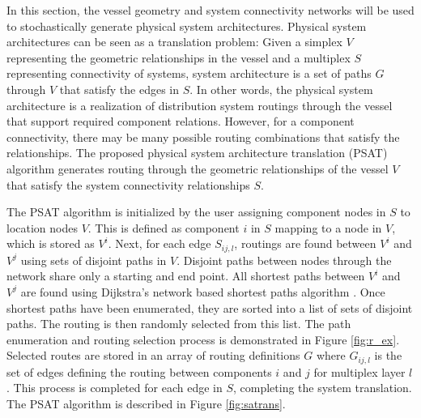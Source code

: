 \documentclass[preprint,12pt]{elsarticle}
\begin{document}
In this section, the vessel geometry and system connectivity networks will be used to stochastically generate physical system architectures. Physical system architectures can be seen as a translation problem: Given a simplex $V$ representing the geometric relationships in the vessel and a multiplex $S$ representing connectivity of systems, system architecture is a set of paths $G$ through $V$ that satisfy the edges in $S$. In other words, the physical system architecture is a realization of distribution system routings through the vessel that support required component relations. However, for a component connectivity, there may be many possible routing combinations that satisfy the relationships. The proposed physical system architecture translation (PSAT) algorithm  generates routing through the geometric relationships of the vessel $V$ that satisfy the system connectivity relationships $S$.   


The PSAT algorithm is initialized by the user assigning component nodes in $S$ to location nodes $V$. This is defined as component $i$ in $S$ mapping to a node in $V$, which is stored as $V^i$. Next, for each edge $S_{ij,l}$, routings are found between $V^i$ and $V^j$ using sets of disjoint paths in $V$. Disjoint paths between nodes through the network share only a starting and end point. All shortest paths between $V^i$ and $V^j$ are found using Dijkstra's network based shortest paths algorithm \citep{Dijkstra1959}. Once shortest paths have been enumerated, they are sorted into a list of sets of disjoint paths. The routing is then randomly selected from this list. The path enumeration and routing selection process is demonstrated in Figure \ref{fig:r_ex}. Selected routes are stored in an array of routing definitions $G$ where $G_{ij,l}$ is the set of edges defining the routing between components $i$ and $j$ for multiplex layer $l$. This process is completed for each edge in $S$, completing the system translation. The PSAT algorithm is described in Figure \ref{fig:satrans}. 
\end{document}
